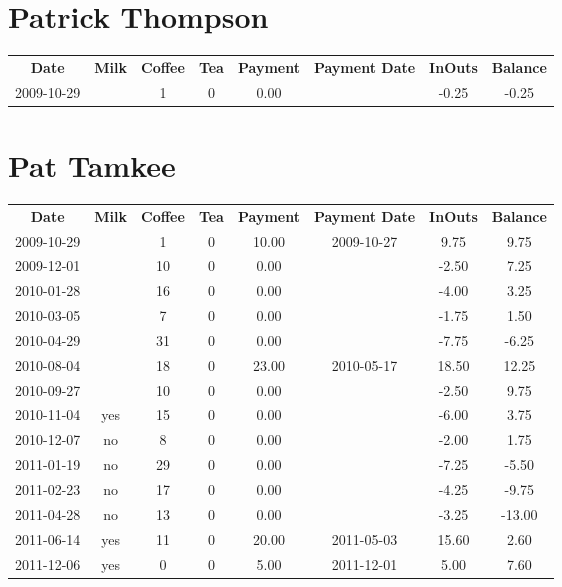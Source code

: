 \section{Patrick Thompson}

\begin{center}
\begin{tabular}{cccccccc}
\textbf{Date} & \textbf{Milk} & \textbf{Coffee} & \textbf{Tea} & \textbf{Payment} & \textbf{Payment Date} & \textbf{InOuts} & \textbf{Balance} \\
2009-10-29 &  & 1 & 0 & 0.00 &  & -0.25 & -0.25
\end{tabular}
\end{center}

\section{Pat Tamkee}

\begin{center}
\begin{tabular}{cccccccc}
\textbf{Date} & \textbf{Milk} & \textbf{Coffee} & \textbf{Tea} & \textbf{Payment} & \textbf{Payment Date} & \textbf{InOuts} & \textbf{Balance} \\
2009-10-29 &  &  1 & 0 & 10.00 & 2009-10-27 &  9.75 &   9.75\\ 
2009-12-01 &  & 10 & 0 &  0.00 &  & -2.50 &   7.25\\ 
2010-01-28 &  & 16 & 0 &  0.00 &  & -4.00 &   3.25\\ 
2010-03-05 &  &  7 & 0 &  0.00 &  & -1.75 &   1.50\\ 
2010-04-29 &  & 31 & 0 &  0.00 &  & -7.75 &  -6.25\\ 
2010-08-04 &  & 18 & 0 & 23.00 & 2010-05-17 & 18.50 &  12.25\\ 
2010-09-27 &  & 10 & 0 &  0.00 &  & -2.50 &   9.75\\ 
2010-11-04 & yes & 15 & 0 &  0.00 &  & -6.00 &   3.75\\ 
2010-12-07 & no &  8 & 0 &  0.00 &  & -2.00 &   1.75\\ 
2011-01-19 & no & 29 & 0 &  0.00 &  & -7.25 &  -5.50\\ 
2011-02-23 & no & 17 & 0 &  0.00 &  & -4.25 &  -9.75\\ 
2011-04-28 & no & 13 & 0 &  0.00 &  & -3.25 & -13.00\\ 
2011-06-14 & yes & 11 & 0 & 20.00 & 2011-05-03 & 15.60 &   2.60\\ 
2011-12-06 & yes &  0 & 0 &  5.00 & 2011-12-01 &  5.00 &   7.60
\end{tabular}
\end{center}

